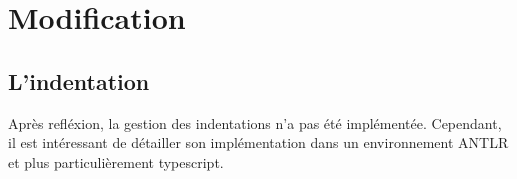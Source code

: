 \documentclass[
    iict, %
    il, %
]{heig-tb}
\begin{document}
\section{Modification}






\subsection{L'indentation}

Après refléxion, la gestion des indentations n'a pas été implémentée. Cependant, il est intéressant de détailler son implémentation dans un environnement ANTLR
et plus particulièrement typescript.
\end{document}
